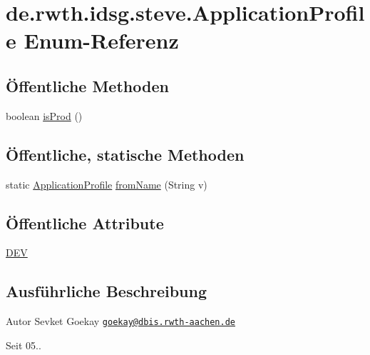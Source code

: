 \hypertarget{enumde_1_1rwth_1_1idsg_1_1steve_1_1_application_profile}{\section{de.\-rwth.\-idsg.\-steve.\-Application\-Profile Enum-\/\-Referenz}
\label{enumde_1_1rwth_1_1idsg_1_1steve_1_1_application_profile}
}
\subsection*{Öffentliche Methoden}
\begin{DoxyCompactItemize}
\item 
boolean \hyperlink{enumde_1_1rwth_1_1idsg_1_1steve_1_1_application_profile_a3c96eb2196584ccf04e8dce5fb1cbf12}{is\-Prod} ()
\end{DoxyCompactItemize}
\subsection*{Öffentliche, statische Methoden}
\begin{DoxyCompactItemize}
\item 
static \hyperlink{enumde_1_1rwth_1_1idsg_1_1steve_1_1_application_profile}{Application\-Profile} \hyperlink{enumde_1_1rwth_1_1idsg_1_1steve_1_1_application_profile_afd65166694416ce9a6ac05ba32dd3e32}{from\-Name} (String v)
\end{DoxyCompactItemize}
\subsection*{Öffentliche Attribute}
\begin{DoxyCompactItemize}
\item 
\hyperlink{enumde_1_1rwth_1_1idsg_1_1steve_1_1_application_profile_aea823c53d450f28193364cc9621731f6}{D\-E\-V}
\end{DoxyCompactItemize}


\subsection{Ausführliche Beschreibung}
\begin{DoxyAuthor}{Autor}
Sevket Goekay \href{mailto:goekay@dbis.rwth-aachen.de}{\tt goekay@dbis.\-rwth-\/aachen.\-de} 
\end{DoxyAuthor}
\begin{DoxySince}{Seit}
05.. 
\end{DoxySince}


